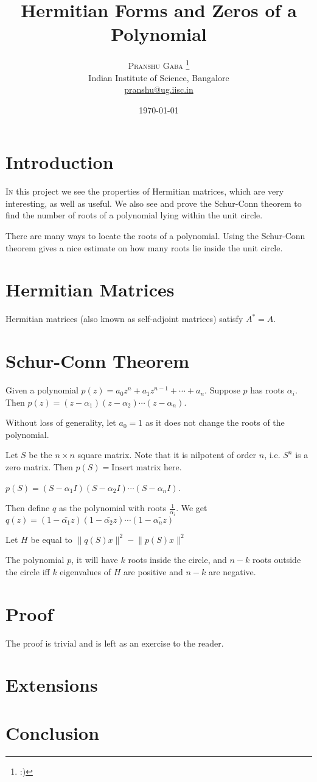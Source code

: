 \documentclass[twofold, twocolumn]{article}
\author{%
\textsc{Pranshu Gaba} \thanks{:)} \\[1ex]
\normalsize Indian Institute of Science, Bangalore \\
\normalsize \href{mailto:pranshu@ug.iisc.in}{pranshu@ug.iisc.in}}
\title{Hermitian Forms and Zeros of a Polynomial}
\date{\today}
\newcommand*\conj[1]{\bar{#1}}
\begin{document}
\maketitle

\section{Introduction}

\lettrine[nindent=0em,lines=2]{I}n this project we see the properties of Hermitian matrices, which are very interesting, as well as useful. We also see and prove the Schur-Conn theorem to find the number of roots of a polynomial lying within the unit circle. 

There are many ways to locate the roots of a polynomial. Using the Schur-Conn theorem gives a nice estimate on how many roots lie inside the unit circle.


\section{Hermitian Matrices}
Hermitian matrices (also known as self-adjoint matrices) satisfy \(A^* = A\). 

\section{Schur-Conn Theorem}

Given a polynomial \(p(z) = a_0 z^n + a_1z^{n-1} + \cdots + a_n\). Suppose \(p\) has roots \(\alpha_i\). Then \(p(z) = (z - \alpha_1) (z - \alpha_2) \cdots (z - \alpha_n)\). 

Without loss of generality, let \(a_0 = 1\) as it does not change the roots of the polynomial. 

Let \(S\) be the \(n \times n\) square matrix. Note that it is nilpotent of order \(n\), i.e. \(S^n\) is a zero matrix. Then \(p(S) = \text{Insert matrix here}\). 


\(p(S) = (S - \alpha_1I) (S - \alpha_2 I) \cdots (S - \alpha_n I)\). 

Then define \(q\) as the polynomial with roots \(\frac {1}{\conj{\alpha_i}}\). We get \(q(z) = (1 - \conj{\alpha_1}z) (1 - \conj{\alpha_2}z) \cdots (1 - \conj{\alpha_nz})\)


Let \(H\) be equal to \(\lVert q(S) x \rVert^2 - \lVert p(S) x \rVert^2\)


The polynomial \(p\), it will have \(k\) roots inside the circle, and \(n-k\) roots outside the circle iff \(k\) eigenvalues of \(H\) are positive and \(n-k\) are negative. 

\section{Proof}
The proof is trivial and is left as an exercise to the reader. 

\section{Extensions}

\section{Conclusion}
\end{document}
